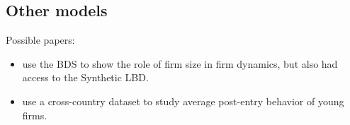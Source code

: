 \documentclass{article}
\begin{document}
\subsection{Other models}

Possible papers:
\begin{itemize}
\item \textcite{10.1257/aer.20141280} use the BDS to show the role of firm size in firm dynamics, but also had access to the Synthetic LBD.
\item \textcite{NBERc0480} use a cross-country dataset to study average post-entry behavior of young firms. 
\end{itemize}

%
%
\printbibliography
\end{document}
